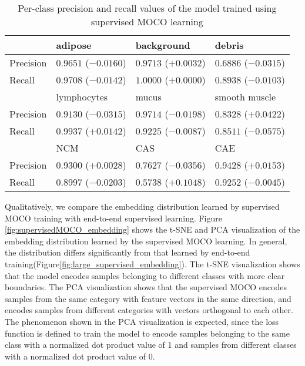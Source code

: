 \documentclass[12pt,twoside]{report}
\begin{document}
\begin{table}[]
    \centering
    \begin{tabular}{llll}
\toprule
 & adipose & background & debris \\
\hline
Precision & $0.9651$ ($-0.0160$) & $0.9713$ ($+0.0032$) & $0.6886$ ($-0.0315$) \\
Recall & $0.9708$ ($-0.0142$) & $1.0000$ ($+0.0000$) & $0.8938$ ($-0.0103$) \\
\toprule
 & lymphocytes & mucus & smooth muscle \\
\hline
Precision & $0.9130$ ($-0.0315$) & $0.9714$ ($-0.0198$) & $0.8328$ ($+0.0422$) \\
Recall & $0.9937$ ($+0.0142$) & $0.9225$ ($-0.0087$) & $0.8511$ ($-0.0575$) \\
\toprule
 & NCM & CAS & CAE \\
\hline
Precision & $0.9300$ ($+0.0028$) & $0.7627$ ($-0.0356$) & $0.9428$ ($+0.0153$) \\
Recall & $0.8997$ ($-0.0203$) & $0.5738$ ($+0.1048$) & $0.9252$ ($-0.0045$) \\
    \bottomrule
    \end{tabular}
    \caption{Per-class precision and recall values of the model trained using supervised MOCO learning}
    \label{tab:supervisedMOCO_preci_recall}
\end{table}


Qualitatively, we compare the embedding distribution learned by supervised MOCO training with end-to-end supervised learning. Figure \ref{fig:supervisedMOCO_embedding} shows the t-SNE and PCA visualization of the embedding distribution learned by the supervised MOCO learning. In general, the distribution differs significantly from that learned by end-to-end training(Figure\ref{fig:large_supervised_embedding}). The t-SNE visualization shows that the model encodes samples belonging to different classes with more clear boundaries. The PCA visualization shows that the supervised MOCO encodes samples from the same category with feature vectors in the same direction, and encodes samples from different categories with vectors orthogonal to each other. The phenomenon shown in the PCA visualization is expected, since the loss function is defined to train the model to encode samples belonging to the same class with a normalized dot product value of 1 and samples from different classes with a normalized dot product value of 0. \\
\end{document}
